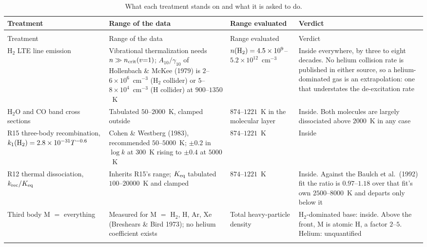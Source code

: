 \documentclass[english,a4paper]{my_memo}
\begin{document}
\begin{longtable}{@{}>{\raggedright\arraybackslash}p{}>{\raggedright\arraybackslash}p{}>{\raggedright\arraybackslash}p{}>{\raggedright\arraybackslash}p{}@{}}
\caption{What each treatment stands on and what it is asked to do.}
\label{tab:validity}\\
\toprule
Treatment & Range of the data & Range evaluated & Verdict \\
\midrule
\endfirsthead
\multicolumn{4}{@{}l}{\emph{\tablename~\thetable\ (continued)}}\\
\toprule
Treatment & Range of the data & Range evaluated & Verdict \\
\midrule
\endhead
\bottomrule
\endlastfoot
H$_2$ LTE line emission
  & Vibrational thermalization needs $n \gg n_{\rm crit}(v{=}1)$;
    $A_{10}/\gamma_{10}$ of Hollenbach \& McKee (1979) is
    $2$--$6\times10^{6}$~cm$^{-3}$ (H$_2$ collider) or
    $5$--$8\times10^{4}$~cm$^{-3}$ (H collider) at $900$--$1350$~K
  & $n({\rm H_2}) = 4.5\times10^{9}$--$5.2\times10^{12}$~cm$^{-3}$
  & Inside everywhere, by three to eight decades. No helium collision rate is
    published in either source, so a helium-dominated gas is an
    extrapolation: one that understates the de-excitation rate \\
\addlinespace
H$_2$O and CO band cross sections
  & Tabulated $50$--$2000$~K, clamped outside
  & $874$--$1221$~K in the molecular layer
  & Inside. Both molecules are largely dissociated above $2000$~K in any case
    \\
\addlinespace
R15 three-body recombination, $k_1({\rm H_2}) = 2.8\times10^{-31}T^{-0.6}$
  & Cohen \& Westberg (1983), recommended $50$--$5000$~K; $\pm0.2$ in
    $\log k$ at $300$~K rising to $\pm0.4$ at $5000$~K
  & $874$--$1221$~K
  & Inside \\
\addlinespace
R12 thermal dissociation, $k_{\rm rec}/K_{\rm eq}$
  & Inherits R15's range; $K_{\rm eq}$ tabulated $100$--$20000$~K and clamped
  & $874$--$1221$~K
  & Inside. Against the Baulch et al.\ (1992) fit the ratio is $0.97$--$1.18$
    over that fit's own $2500$--$8000$~K and departs only below it \\
\addlinespace
Third body M $=$ everything
  & Measured for M $=$ H$_2$, H, Ar, Xe (Breshears \& Bird 1973);
    no helium coefficient exists
  & Total heavy-particle density
  & H$_2$-dominated base: inside. Above the front, M is atomic H, a factor
    $2$--$5$. Helium: unquantified \\
\addlinespace

\end{longtable}
\end{document}
